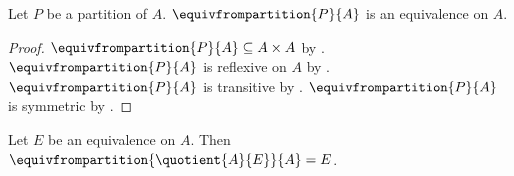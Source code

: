 \begin{proposition}\label{equivalence_from_partition_is_equivalence}
    Let $P$ be a partition of $A$.
    $\equivfrompartition{P}{A}$ is an equivalence on $A$.
\end{proposition}
\begin{proof}
    $\equivfrompartition{P}{A}\subseteq A\times A$
        by .
    $\equivfrompartition{P}{A}$ is reflexive on $A$
        by .
    $\equivfrompartition{P}{A}$ is transitive
        by .
    $\equivfrompartition{P}{A}$ is symmetric
        by .
\end{proof}

\begin{proposition}\label{equivalence_from_quotient}
    Let $E$ be an equivalence on $A$.
    Then $\equivfrompartition{\quotient{A}{E}}{A} = E$.
\end{proposition}
